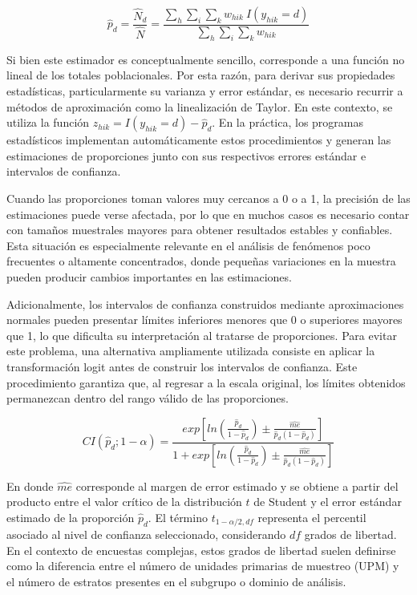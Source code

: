 \documentclass[
  spanish,
  12pt,
]{book}
\begin{document}
\[
\hat{p}_d = \frac{\hat{N}_d}{\hat{N}} = \frac{\displaystyle\sum_{h} \sum_{i} \sum_{k} w_{hik} \ I(y_{hik}=d)} {\displaystyle\sum_{h} \sum_{i} \sum_{k} w_{hik}}
\]

Si bien este estimador es conceptualmente sencillo, corresponde a una función no lineal de los totales poblacionales. Por esta razón, para derivar sus propiedades estadísticas, particularmente su varianza y error estándar, es necesario recurrir a métodos de aproximación como la linealización de Taylor. En este contexto, se utiliza la función \(z_{hik}=I(y_{hik}=d)-\hat{p}_d\). En la práctica, los programas estadísticos implementan automáticamente estos procedimientos y generan las estimaciones de proporciones junto con sus respectivos errores estándar e intervalos de confianza.

Cuando las proporciones toman valores muy cercanos a 0 o a 1, la precisión de las estimaciones puede verse afectada, por lo que en muchos casos es necesario contar con tamaños muestrales mayores para obtener resultados estables y confiables. Esta situación es especialmente relevante en el análisis de fenómenos poco frecuentes o altamente concentrados, donde pequeñas variaciones en la muestra pueden producir cambios importantes en las estimaciones.

Adicionalmente, los intervalos de confianza construidos mediante aproximaciones normales pueden presentar límites inferiores menores que 0 o superiores mayores que 1, lo que dificulta su interpretación al tratarse de proporciones. Para evitar este problema, una alternativa ampliamente utilizada consiste en aplicar la transformación logit antes de construir los intervalos de confianza. Este procedimiento garantiza que, al regresar a la escala original, los límites obtenidos permanezcan dentro del rango válido de las proporciones.

\[
CI(\hat{p}_d; 1-\alpha) = \frac{exp \left[ln\left(\frac{\hat{p}_d}{1-\hat{p}_d}\right) \pm \frac{\widehat{me}}{\hat{p}_d(1-\hat{p}_d)}\right]}{1 + exp \left[ln\left(\frac{\hat{p}_d}{1-\hat{p}_d}\right) \pm \frac{\widehat{me}}{\hat{p}_d(1-\hat{p}_d)}\right]}
\]

En donde \(\widehat{me}\) corresponde al margen de error estimado y se obtiene a partir del producto entre el valor crítico de la distribución \(t\) de Student y el error estándar estimado de la proporción \(\hat{p}_d\). El término \(t_{1-\alpha/2, df}\) representa el percentil asociado al nivel de confianza seleccionado, considerando \(df\) grados de libertad. En el contexto de encuestas complejas, estos grados de libertad suelen definirse como la diferencia entre el número de unidades primarias de muestreo (UPM) y el número de estratos presentes en el subgrupo o dominio de análisis.
\end{document}
